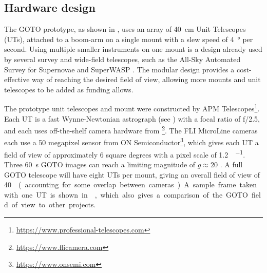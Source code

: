 
\subsection{Hardware design}
\label{sec:goto_design}
\begin{colsection}

The GOTO prototype, as shown in , uses an array of \SI{40}{\cm} Unit Telescopes (UTs), attached to a boom-arm on a single mount with a slew speed of \SI{4}{\degree} per second. Using multiple smaller instruments on one mount is a design already used by several survey and wide-field telescopes, such as the All-Sky Automated Survey for Supernovae  \citep[ASAS-SN,][]{ASAS-SN} and SuperWASP  \citep{SuperWASP}. The modular design provides a cost-effective way of reaching the desired field of view, allowing more mounts and unit telescopes to be added as funding allows.

The prototype unit telescopes and mount were constructed by APM Telescopes\footnote{\url{https://www.professional-telescopes.com}}. Each UT is a fast Wynne-Newtonian astrograph (see ) with a focal ratio of f/2.5, and each uses off-the-shelf camera hardware from \footnote{\url{https://www.flicamera.com}}. The FLI MicroLine cameras each use a 50 megapixel sensor from ON Semiconductor\footnote{\url{https://www.onsemi.com}}, which gives each UT a field of view of approximately 6 square degrees with a pixel scale of \SI[per-mode=symbol]{1.2}{\arcsec\per\pixel}. Three \SI{60}{\second} GOTO images can reach a limiting magnitude of $g \approx 20$ \citep[see ;][]{S190425z_GOTO}. A full GOTO telescope will have eight UTs per mount, giving an overall field of view of \SI{40}{\square\deg} (accounting for some overlap between cameras). A sample frame taken with one UT is shown in , which also gives a comparison of the GOTO field of view to other projects.


\end{colsection}
